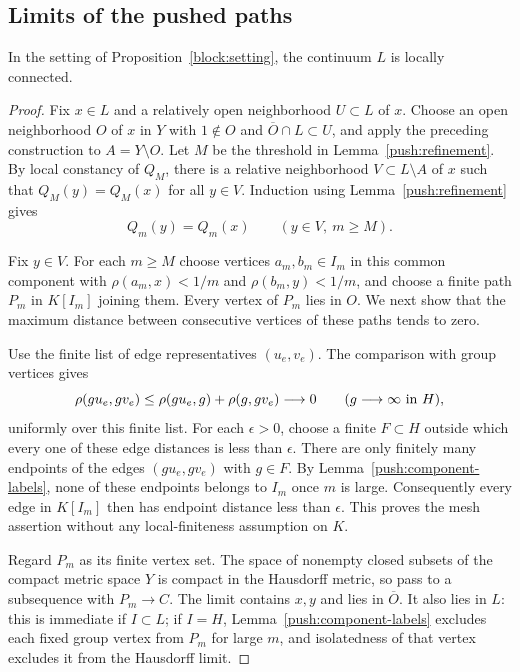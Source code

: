 \subsection{Limits of the pushed paths}

\begin{proposition}\label{push:local-connected}
In the setting of Proposition~\ref{block:setting}, the continuum $L$
is locally connected.
\end{proposition}
\begin{proof}
Fix $x\in L$ and a relatively open neighborhood $U\subset L$ of $x$.
Choose an open neighborhood $O$ of $x$ in $Y$ with $1\notin O$ and
$\overline O\cap L\subset U$, and apply the preceding construction to
$A=Y\setminus O$.
Let $M$ be the threshold in Lemma~\ref{push:refinement}.
By local constancy of $Q_M$, there is a relative neighborhood
$V\subset L\setminus A$ of $x$ such that $Q_M(y)=Q_M(x)$ for all
$y\in V$.
Induction using Lemma~\ref{push:refinement} gives
\[
 Q_m(y)=Q_m(x)\qquad(y\in V,\ m\ge M).
\]

Fix $y\in V$.
For each $m\ge M$ choose vertices $a_m,b_m\in I_m$ in this common
component with $\rho(a_m,x)<1/m$ and $\rho(b_m,y)<1/m$,
and choose a finite path $P_m$ in $K[I_m]$ joining them.
Every vertex of $P_m$ lies in $O$.
We next show that the maximum distance between consecutive vertices of
these paths tends to zero.

Use the finite list of edge representatives $(u_e,v_e)$.
The comparison with group vertices gives
\[
 \rho(gu_e,gv_e)
 \le\rho(gu_e,g)+\rho(g,gv_e)\longrightarrow0
 \qquad(g\longrightarrow\infty\hbox{ in }H),
\]
uniformly over this finite list.
For each $\epsilon>0$, choose a finite $F\subset H$ outside which every
one of these edge distances is less than $\epsilon$.
There are only finitely many endpoints of the edges
$(gu_e,gv_e)$ with $g\in F$.
By Lemma~\ref{push:component-labels}, none of these endpoints belongs to
$I_m$ once $m$ is large.
Consequently every edge in $K[I_m]$ then has endpoint distance less than
$\epsilon$.  This proves the mesh assertion without any local-finiteness
assumption on $K$.

Regard $P_m$ as its finite vertex set.
The space of nonempty closed subsets of the compact metric space $Y$
is compact in the Hausdorff metric, so pass to a subsequence with
$P_m\to C$.
The limit contains $x,y$ and lies in $\overline O$.
It also lies in $L$: this is immediate if $I\subset L$; if $I=H$,
Lemma~\ref{push:component-labels} excludes each fixed group vertex from
$P_m$ for large $m$, and isolatedness of that vertex excludes it from
the Hausdorff limit.


\end{proof}
